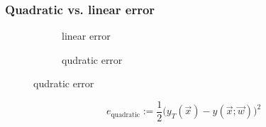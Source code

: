 \begin{frame}\frametitle{Quadratic vs. linear error}

\begin{figure}[ht]
     \centering
     \begin{subfigure}[t]{0.45\textwidth}
         \centering
         \usebox{\imagebox}%
         \caption{linear error}
         \label{fig:quadratic}
     \end{subfigure}
     \hfill
     \begin{subfigure}[t]{0.45\textwidth}
         \centering
         \caption{qudratic error}
         \label{fig:linear}
     \end{subfigure}
	 \label{fig:quadratic_vs_linear}
\end{figure}


\begin{equation}
e_{\text{quadratic}} := \frac{1}{2} \Big( y_{T}(\vec x) - y(\vec x;\vec w)\Big)^{2}
\label{eq:quadratic_error}
\end{equation}


\end{frame}
